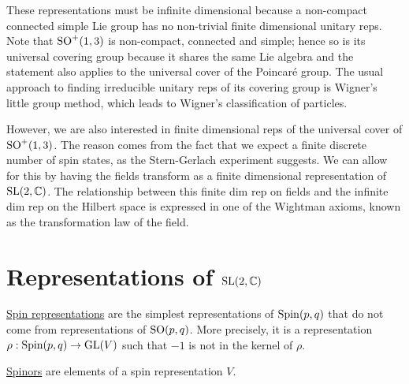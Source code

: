 These representations must be infinite dimensional because a non-compact 
connected simple Lie group has no non-trivial
finite dimensional unitary reps. %
Note that $\operatorname{SO}^+(1,3)$ is non-compact, connected and simple; hence so is its universal
covering group because it shares the same Lie algebra and the statement
also applies to the universal cover of the Poincar\'e group. 
The usual approach to finding irreducible unitary reps of its covering
group is Wigner's little group method, which leads to Wigner's classification of
particles.\cite{wigner_classification} 

However, we are also interested in finite dimensional reps of the universal
cover of $\operatorname{SO}^+(1,3)$. The reason comes from 
the fact that we expect a finite discrete number of spin states, as the
Stern-Gerlach experiment suggests. We can allow for this by having the fields 
transform as a finite dimensional representation of $\operatorname{SL}(2,\mathbb{C})$.  
The relationship between this finite dim rep on fields and the infinite dim rep
on the Hilbert space is expressed in one of the Wightman axioms, known as the
transformation law of the field. 
\begin{comment}
	The axioms states that the fields are operator-valued, acting upon some
	Hilbert space $H$. 
	This axiom states that there is a projective representation
	$U:\mathbb{R}^{1,3}\rtimes\SO(1,3) \to \operatorname{PU}(H)$, and a
	spin representation $\sigma : \SL(2,\mathbb{C}) \to V$ such that 
	\[
	U(L,a)^{\dagger} \phi(x) U(L,a) = \sigma(L)\phi(L^{-1}(x-a))
	\] 
	where on the r.h.s, $\sigma(L)$ is a finite dimensional matrix acting upon
	the vector $(\phi^1, \ldots,\phi^{\dim V})$, and on the l.h.s
	the operator acts on each component of $\phi$. 
	So the finite dim rep gives the "classical field", while the infinite dim
	unitary rep tells us about the particle by Wigner's classification.
\end{comment}

\section{Representations of \texorpdfstring{$\operatorname{SL}(2,\mathbb{C})$}{SL(2,C)}}
\begin{defn}
	\underline{Spin representations} are the simplest representations of 
	$\operatorname{Spin}(p,q)$ that do not come from representations of  $\operatorname{SO}(p,q)$. 
	More precisely, it is a representation $\rho : \operatorname{Spin}(p,q) \to \operatorname{GL}(V)$ such 
	that $-1$ is not in the kernel of $\rho$.

	\underline{Spinors} are elements of a spin representation $V$.
\end{defn}



